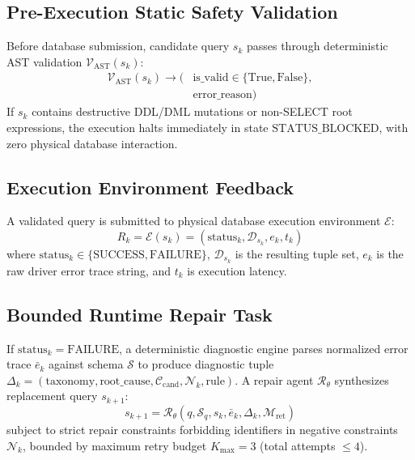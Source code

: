 \subsection{Pre-Execution Static Safety Validation}
Before database submission, candidate query $s_k$ passes through deterministic AST validation $\mathcal{V}_{\text{AST}}(s_k)$:
\begin{equation}
\begin{aligned}
\mathcal{V}_{\text{AST}}(s_k) \to ( & \text{is\_valid} \in \{\text{True}, \text{False}\}, \\
& \text{error\_reason} )
\end{aligned}
\end{equation}
If $s_k$ contains destructive DDL/DML mutations or non-SELECT root expressions, the execution halts immediately in state $\text{STATUS\_BLOCKED}$, with zero physical database interaction.

\subsection{Execution Environment Feedback}
A validated query is submitted to physical database execution environment $\mathcal{E}$:
\begin{equation}
R_k = \mathcal{E}(s_k) = (\text{status}_k, \mathcal{D}_{s_k}, e_k, t_k)
\end{equation}
where $\text{status}_k \in \{\text{SUCCESS}, \text{FAILURE}\}$, $\mathcal{D}_{s_k}$ is the resulting tuple set, $e_k$ is the raw driver error trace string, and $t_k$ is execution latency.

\subsection{Bounded Runtime Repair Task}
If $\text{status}_k = \text{FAILURE}$, a deterministic diagnostic engine parses normalized error trace $\bar{e}_k$ against schema $\mathcal{S}$ to produce diagnostic tuple $\Delta_k = (\text{taxonomy}, \text{root\_cause}, \mathcal{C}_{\text{cand}}, \mathcal{N}_k, \text{rule})$. A repair agent $\mathcal{R}_{\theta}$ synthesizes replacement query $s_{k+1}$:
\begin{equation}
s_{k+1} = \mathcal{R}_{\theta}(q, \mathcal{S}_q, s_k, \bar{e}_k, \Delta_k, \mathcal{M}_{\text{ret}})
\end{equation}
subject to strict repair constraints forbidding identifiers in negative constraints $\mathcal{N}_k$, bounded by maximum retry budget $K_{\max} = 3$ (total attempts $\le 4$).

